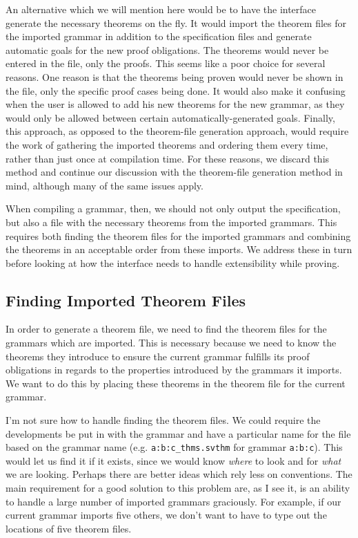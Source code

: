 \documentclass[11pt]{article}
\newcommand{\grammar}[1]{\texttt{#1}}
\begin{document}
An alternative which we will mention here would be to have the
interface generate the necessary theorems on the fly.  It would import
the theorem files for the imported grammar in addition to the
specification files and generate automatic goals for the new proof
obligations.  The theorems would never be entered in the file, only
the proofs.
%
This seems like a poor choice for several reasons.  One reason is that
the theorems being proven would never be shown in the file, only the
specific proof cases being done.  It would also make it confusing when
the user is allowed to add his new theorems for the new grammar, as
they would only be allowed between certain automatically-generated
goals.  Finally, this approach, as opposed to the theorem-file
generation approach, would require the work of gathering the imported
theorems and ordering them every time, rather than just once at
compilation time.
%
For these reasons, we discard this method and continue our discussion
with the theorem-file generation method in mind, although many of the
same issues apply.


When compiling a grammar, then, we should not only output the
specification, but also a file with the necessary theorems from the
imported grammars.  This requires both finding the theorem files for
the imported grammars and combining the theorems in an acceptable
order from these imports.  We address these in turn before looking at
how the interface needs to handle extensibility while proving.




\subsection{Finding Imported Theorem Files} \label{subsec:findingThmFiles}

In order to generate a theorem file, we need to find the theorem files
for the grammars which are imported.  This is necessary because we
need to know the theorems they introduce to ensure the current grammar
fulfills its proof obligations in regards to the properties introduced
by the grammars it imports.  We want to do this by placing these
theorems in the theorem file for the current grammar.


I'm not sure how to handle finding the theorem files.  We could
require the developments be put in with the grammar and have a
particular name for the file based on the grammar name
(e.g. \texttt{a:b:c\_thms.svthm} for grammar \grammar{a:b:c}).  This
would let us find it if it exists, since we would know \emph{where} to
look and for \emph{what} we are looking.  Perhaps there are better
ideas which rely less on conventions.  The main requirement for a good
solution to this problem are, as I see it, is an ability to handle a
large number of imported grammars graciously.  For example, if our
current grammar imports five others, we don't want to have to type out
the locations of five theorem files.
\end{document}
